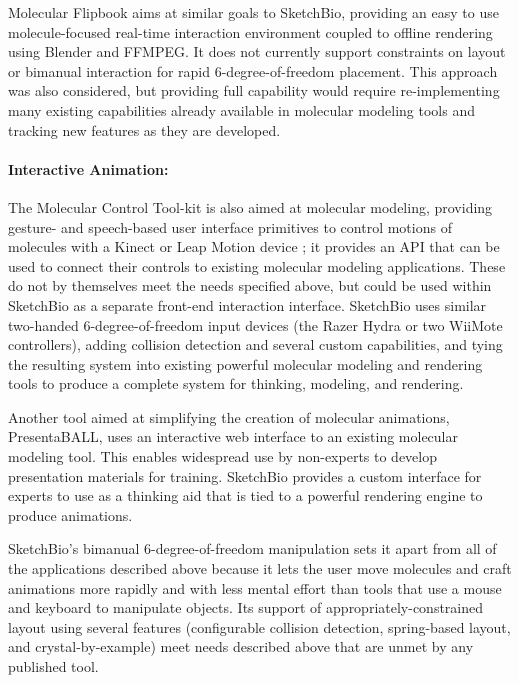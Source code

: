 \documentclass[twocolumn]{bmcart}%
\begin{document}
Molecular Flipbook \cite{flipbook2013} aims at similar goals to SketchBio, providing an easy to use molecule-focused real-time interaction environment coupled to offline rendering using Blender and FFMPEG.  It does not currently support constraints on layout or bimanual interaction for rapid 6-degree-of-freedom placement.
This approach was also considered, but providing full capability would require re-implementing many existing capabilities already available in molecular modeling tools and tracking new features as they are developed.

\paragraph*{Interactive Animation:}
The Molecular Control Tool-kit \cite{sabirmolecular} is also aimed at molecular modeling, providing gesture- and speech-based user interface primitives to control motions of molecules with a Kinect or Leap Motion device \cite{sabirmolecular}; it provides an API that can be used to connect their controls to existing molecular modeling applications.  These do not by themselves meet the needs specified above, but could be used within SketchBio as a separate front-end interaction interface.
SketchBio uses similar two-handed 6-degree-of-freedom input devices (the Razer Hydra or two WiiMote controllers), adding collision detection and several custom capabilities, and tying the resulting system into existing powerful molecular modeling and rendering tools to produce a complete system for thinking, modeling, and rendering.

Another tool aimed at simplifying the creation of molecular animations, PresentaBALL\cite{nickelspresentaball}, uses an interactive web interface to an existing molecular modeling tool.
This enables widespread use by non-experts to develop presentation materials for training.  SketchBio provides a custom interface for experts to use as a thinking aid that is tied to a powerful rendering engine to produce animations.

SketchBio's bimanual 6-degree-of-freedom manipulation sets it apart from all of the applications described above because it lets the user move molecules and craft animations more rapidly and with less mental effort than tools that use a mouse and keyboard to manipulate objects. Its support of appropriately-constrained layout using several features (configurable collision detection, spring-based layout,  and crystal-by-example) meet needs described above that are unmet by any published tool.
\end{document}
